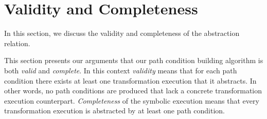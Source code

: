 \section{Validity and Completeness}
\label{subsec:abstraction_relation_validity_completeness}

In this section, we discuss the validity and completeness of the abstraction relation.

This section presents our arguments that our path condition building
algorithm is both \emph{valid} and \emph{complete}. In this context
\emph{validity} means that for each path condition there exists at least one
transformation execution that it abstracts.
In other words, no path conditions are produced that lack a concrete
transformation execution counterpart. \emph{Completeness} of the symbolic
execution means that every transformation execution is abstracted by at least
one path condition.

